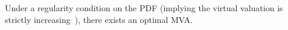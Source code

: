 


%
%
%
%
%


\begin{theorem}
  Under a regularity condition on the PDF 
 (implying the virtual valuation is strictly
  increasing~\cite{Myerson:1981}),
there exists 
an optimal MVA.
\end{theorem}

